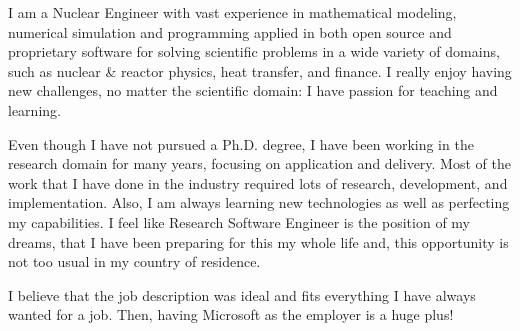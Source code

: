 \documentclass[11pt, a4paper]{templates/awesome-cv}
\begin{document}
\makecvheader[R]

\lfooter{\today}
\rfooter{\thepage/\pageref{LastPage}}
\makecvfooter

\makelettertitle

\begin{cvletter}

I am a Nuclear Engineer with vast experience in mathematical modeling, numerical simulation and programming applied in both open source and proprietary software for solving scientific problems in a wide variety of domains, such as nuclear \& reactor physics, heat transfer, and finance. I really enjoy having new challenges, no matter the scientific domain: I have passion for teaching and learning.

Even though I have not pursued a Ph.D. degree, I have been working in the research domain for many years, focusing on application and delivery. Most of the work that I have done in the industry required lots of research, development, and implementation. Also, I am always learning new technologies as well as perfecting my capabilities. I feel like Research Software Engineer is the position of my dreams, that I have been preparing for this my whole life and, this opportunity is not too usual in my country of residence.

I believe that the job description was ideal and fits everything I have always wanted for a job. Then, having Microsoft as the employer is a huge plus!

\end{cvletter}


\makeletterclosing
\end{document}
